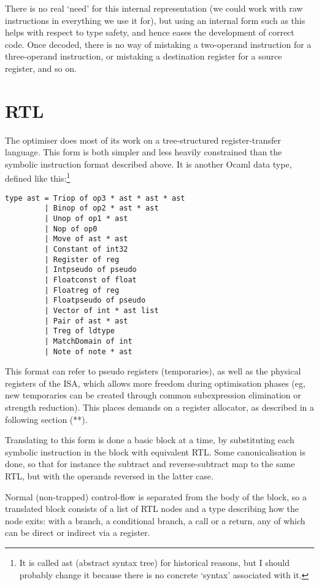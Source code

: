 There is no real `need' for this internal representation (we could work with raw instructions in everything we use it for), but using an internal form such as this helps with respect to type safety, and hence eases the development of correct code. Once decoded, there is no way of mistaking a two-operand instruction for a three-operand instruction, or mistaking a destination register for a source register, and so on.

\section{RTL}

The optimiser does most of its work on a tree-structured register-transfer language. This form is both simpler and less heavily constrained than the symbolic instruction format described above. It is another Ocaml data type, defined like this:\footnote{It is called ast (abstract syntax tree) for historical reasons, but I should probably change it because there is no concrete `syntax' associated with it.}

\begin{verbatim}
type ast = Triop of op3 * ast * ast * ast
         | Binop of op2 * ast * ast
         | Unop of op1 * ast
         | Nop of op0
         | Move of ast * ast
         | Constant of int32
         | Register of reg
         | Intpseudo of pseudo
         | Floatconst of float
         | Floatreg of reg
         | Floatpseudo of pseudo
         | Vector of int * ast list
         | Pair of ast * ast
         | Treg of ldtype
         | MatchDomain of int
         | Note of note * ast
\end{verbatim}

This format can refer to pseudo registers (temporaries), as well as the physical registers of the ISA, which allows more freedom during optimisation phases (eg, new temporaries can be created through common subexpression elimination or strength reduction). This places demands on a register allocator, as described in a following section (**).

Translating to this form is done a basic block at a time, by substituting each symbolic instruction in the block with equivalent RTL. Some canonicalisation is done, so that for instance the subtract and reverse-subtract map to the same RTL, but with the operands reversed in the latter case.

Normal (non-trapped) control-flow is separated from the body of the block, so a translated block consists of a list of RTL nodes and a type describing how the node exits: with a branch, a conditional branch, a call or a return, any of which can be direct or indirect via a register.

